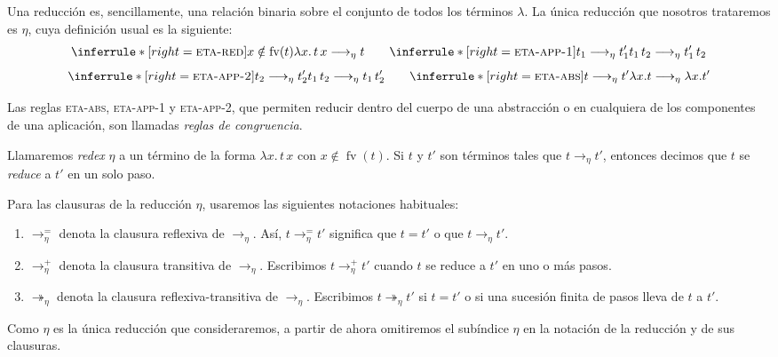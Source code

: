 \documentclass[
  spanish,
  letterpaper,
  DIV=11,
  numbers=noendperiod]{scrreprt}
\theoremstyle{remark}
\begin{document}
Una reducción es, sencillamente, una relación binaria sobre el conjunto
de todos los términos \(\lambda\). La única reducción que nosotros
trataremos es \(\eta\), cuya definición usual es la siguiente: \[
\inferrule*[right=\textsc{eta-red}]
  {x \notin \operatorname{fv}(t)}
  {\lambda x. \, t \, x
   \longrightarrow_{\eta} t}
\qquad
\inferrule*[right=\textsc{eta-app-1}]
  {t_1 \longrightarrow_{\eta} t_1'}
  {t_1 \, t_2
   \longrightarrow_{\eta}
   t_1' \, t_2}
\] \[
\inferrule*[right=\textsc{eta-app-2}]
  {t_2 \longrightarrow_{\eta} t_2'}
  {t_1 \, t_2
   \longrightarrow_{\eta}
   t_1 \, t_2'}
\qquad
\inferrule*[right=\textsc{eta-abs}]
  {t \longrightarrow_{\eta} t'}
  {\lambda x. t
   \longrightarrow_{\eta}
   \lambda x. t'}
\]

Las reglas \textsc{eta-abs}, \textsc{eta-app-1} y \textsc{eta-app-2},
que permiten reducir dentro del cuerpo de una abstracción o en
cualquiera de los componentes de una aplicación, son llamadas
\emph{reglas de congruencia}.

Llamaremos \emph{redex} \(\eta\) a un término de la forma
\(\lambda x.\,t\,x\) con \(x\notin\operatorname{fv}(t)\). Si \(t\) y
\(t'\) son términos tales que \(t \longrightarrow_{\eta} t'\), entonces
decimos que \(t\) se \emph{reduce} a \(t'\) en un solo paso.

Para las clausuras de la reducción \(\eta\), usaremos las siguientes
notaciones habituales:

\begin{enumerate}
\def\labelenumi{\arabic{enumi}.}
\item
  \(\longrightarrow_{\eta}^{=}\) denota la clausura reflexiva de
  \(\longrightarrow_\eta\). Así, \(t \longrightarrow_{\eta}^{=} t'\)
  significa que \(t=t'\) o que \(t \longrightarrow_\eta t'\).
\item
  \(\longrightarrow_{\eta}^{+}\) denota la clausura transitiva de
  \(\longrightarrow_\eta\). Escribimos
  \(t \longrightarrow_{\eta}^{+} t'\) cuando \(t\) se reduce a \(t'\) en
  uno o más pasos.
\item
  \(\twoheadrightarrow_{\eta}\) denota la clausura reflexiva-transitiva
  de \(\longrightarrow_\eta\). Escribimos
  \(t \twoheadrightarrow_\eta t'\) si \(t=t'\) o si una sucesión finita
  de pasos lleva de \(t\) a \(t'\).
\end{enumerate}

Como \(\eta\) es la única reducción que consideraremos, a partir de
ahora omitiremos el subíndice \(\eta\) en la notación de la reducción y
de sus clausuras.
\end{document}
